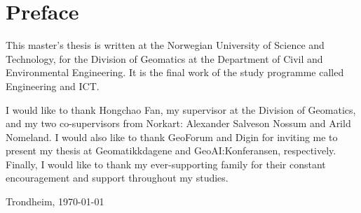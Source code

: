 \section*{Preface}

\begin{comment}
The Preface includes the facts: what type of project, where it is conducted,
who supervised, and any acknowledgements you wish to give.

This Master's Thesis template was created by Bj\"orn Gamb\"ack and is based on a template that he created for the 2016 ``Experts in Team'' course on
Computational Creativity (TDT4853) at the Norwegian University of Science and Technology (NTNU),
which in turn was heavily based on the 2014 AI Master's Thesis template created by Anders Kofod-Petersen ---
with some of the explaining text stemming from Anders' original template.

You may basically thank anybody you like (and avoid thanking anybody you do not like) and in any form you like.
However, it is a good idea to always thank people who made direct contributions, e.g., those whose data you have been given access to or those whose images you have been given permission to reproduce.

Some students choose to include the text of the original project description in the Preface. This is possible but not necessary,
in particular not if you have changed the theme somewhat over time.
The Preface of the Master's Thesis might also be a good place to introduce your Specialisation Project, in case you plan
on reusing some texts from it (since the Specialisation Project is not a published and easily accessible work, and might
not be known to your audience, neither your text in itself nor even the general concept as such).
\end{comment}

This master's thesis is written at the Norwegian University of Science and Technology, for the Division of Geomatics at the Department of Civil and Environmental Engineering. It is the final work of the study programme called Engineering and ICT.

I would like to thank Hongchao Fan, my supervisor at the Division of Geomatics, and my two co-supervisors from Norkart: Alexander Salveson Nossum and Arild Nomeland. I would also like to thank GeoForum and Digin for inviting me to present my thesis at Geomatikkdagene and GeoAI:Konferansen, respectively. Finally, I would like to thank my ever-supporting family for their constant encouragement and support throughout my studies.

\vfill

\hfill \thesisAuthor

\hfill Trondheim, \today
